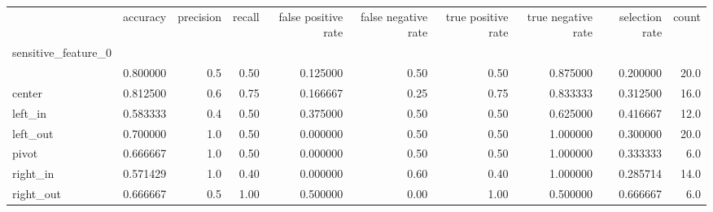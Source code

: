 \begin{tabular}{lrrrrrrrrr}
\toprule
{} &  accuracy &  precision &  recall &  false positive rate &  false negative rate &  true positive rate &  true negative rate &  selection rate &  count \\
sensitive\_feature\_0 &           &            &         &                      &                      &                     &                     &                 &        \\
\midrule
                    &  0.800000 &        0.5 &    0.50 &             0.125000 &                 0.50 &                0.50 &            0.875000 &        0.200000 &   20.0 \\
center              &  0.812500 &        0.6 &    0.75 &             0.166667 &                 0.25 &                0.75 &            0.833333 &        0.312500 &   16.0 \\
left\_in             &  0.583333 &        0.4 &    0.50 &             0.375000 &                 0.50 &                0.50 &            0.625000 &        0.416667 &   12.0 \\
left\_out            &  0.700000 &        1.0 &    0.50 &             0.000000 &                 0.50 &                0.50 &            1.000000 &        0.300000 &   20.0 \\
pivot               &  0.666667 &        1.0 &    0.50 &             0.000000 &                 0.50 &                0.50 &            1.000000 &        0.333333 &    6.0 \\
right\_in            &  0.571429 &        1.0 &    0.40 &             0.000000 &                 0.60 &                0.40 &            1.000000 &        0.285714 &   14.0 \\
right\_out           &  0.666667 &        0.5 &    1.00 &             0.500000 &                 0.00 &                1.00 &            0.500000 &        0.666667 &    6.0 \\
\bottomrule
\end{tabular}
